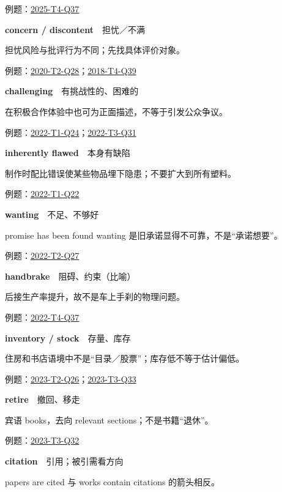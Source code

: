 \documentclass[11pt,a4paper]{article}
\begin{document}
\noindent\small 例题：\hyperref[idx-2025-T4-Q37]{2025-T4-Q37}\normalsize\par\medskip
{}\noindent\textbf{concern / discontent}　担忧／不满\par\nopagebreak
担忧风险与批评行为不同；先找具体评价对象。

\noindent\small 例题：\hyperref[idx-2020-T2-Q28]{2020-T2-Q28}；\hyperref[idx-2018-T4-Q39]{2018-T4-Q39}\normalsize\par\medskip
{}\noindent\textbf{challenging}　有挑战性的、困难的\par\nopagebreak
在积极合作体验中也可为正面描述，不等于引发公众争议。

\noindent\small 例题：\hyperref[idx-2022-T1-Q24]{2022-T1-Q24}；\hyperref[idx-2022-T3-Q31]{2022-T3-Q31}\normalsize\par\medskip
{}\noindent\textbf{inherently flawed}　本身有缺陷\par\nopagebreak
制作时配比错误使某些物品埋下隐患；不要扩大到所有塑料。

\noindent\small 例题：\hyperref[idx-2022-T1-Q22]{2022-T1-Q22}\normalsize\par\medskip
{}\noindent\textbf{wanting}　不足、不够好\par\nopagebreak
promise has been found wanting 是旧承诺显得不可靠，不是“承诺想要”。

\noindent\small 例题：\hyperref[idx-2022-T2-Q27]{2022-T2-Q27}\normalsize\par\medskip
{}\noindent\textbf{handbrake}　阻碍、约束（比喻）\par\nopagebreak
后接生产率提升，故不是车上手刹的物理问题。

\noindent\small 例题：\hyperref[idx-2022-T4-Q37]{2022-T4-Q37}\normalsize\par\medskip
{}\noindent\textbf{inventory / stock}　存量、库存\par\nopagebreak
住房和书店语境中不是“目录／股票”；库存低不等于估计偏低。

\noindent\small 例题：\hyperref[idx-2023-T2-Q26]{2023-T2-Q26}；\hyperref[idx-2023-T3-Q33]{2023-T3-Q33}\normalsize\par\medskip
{}\noindent\textbf{retire}　撤回、移走\par\nopagebreak
宾语 books，去向 relevant sections；不是书籍“退休”。

\noindent\small 例题：\hyperref[idx-2023-T3-Q32]{2023-T3-Q32}\normalsize\par\medskip
{}\noindent\textbf{citation}　引用；被引需看方向\par\nopagebreak
papers are cited 与 works contain citations 的箭头相反。
\end{document}
